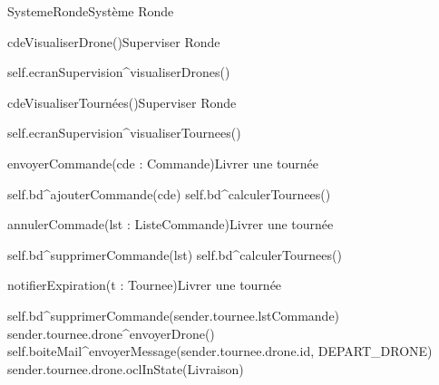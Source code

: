 \begin{OM}{SystemeRonde}{Système Ronde}
    \begin{OMOperation}{cdeVisualiserDrone()}{Superviser Ronde}{}
        \begin{OMMessages}
        \end{OMMessages}
        \OMNoPre
        \begin{OMPost}
self.ecranSupervision^visualiserDrones()
        \end{OMPost}
    \end{OMOperation}

    \begin{OMOperation}{cdeVisualiserTournées()}{Superviser Ronde}{}
        \begin{OMMessages}
        \end{OMMessages}
        \OMNoPre
        \begin{OMPost}
self.ecranSupervision^visualiserTournees()
        \end{OMPost}
    \end{OMOperation}

    \begin{OMOperation}{envoyerCommande(cde : Commande)}{Livrer une tournée}{}
        \begin{OMMessages}
        \end{OMMessages}
        \OMNoPre
        \begin{OMPost}
self.bd^ajouterCommande(cde)
self.bd^calculerTournees()
        \end{OMPost}
    \end{OMOperation}

    \begin{OMOperation}{annulerCommade(lst : ListeCommande)}{Livrer une tournée}{}
        \begin{OMMessages}
        \end{OMMessages}
        \OMNoPre
        \begin{OMPost}
self.bd^supprimerCommande(lst)
self.bd^calculerTournees()
        \end{OMPost}
    \end{OMOperation}

    \begin{OMOperation}{notifierExpiration(t : Tournee)}{Livrer une tournée}{}
        \begin{OMMessages}
        \end{OMMessages}
        \OMNoPre
        \begin{OMPost}
self.bd^supprimerCommande(sender.tournee.lstCommande)
sender.tournee.drone^envoyerDrone()
self.boiteMail^envoyerMessage(sender.tournee.drone.id, DEPART_DRONE)
sender.tournee.drone.oclInState(Livraison)
        \end{OMPost}
    \end{OMOperation}


\end{OM}
